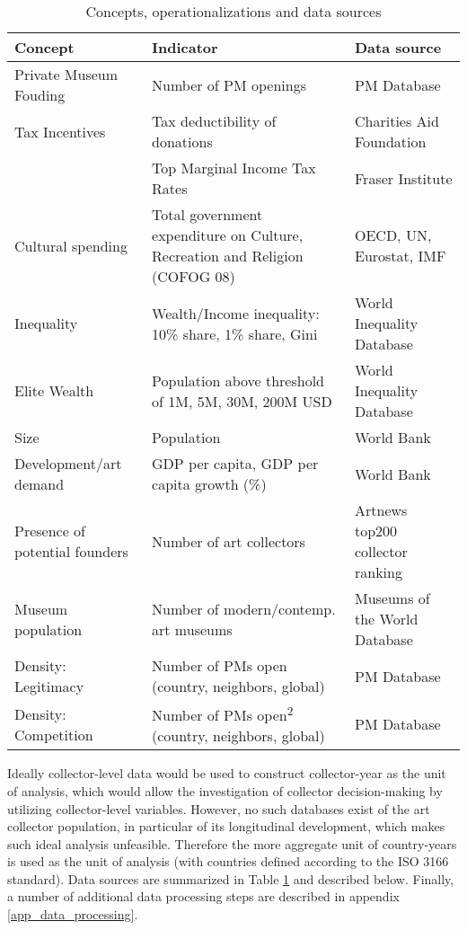\documentclass[11pt]{article}
\begin{document}
\begin{table}[htbp]
\caption{\label{tbl:data_srcs}Concepts, operationalizations and data sources}
\centering
\begin{tabular}{lp{7cm}l}
\hline
Concept & Indicator & Data source\\
\hline
Private Museum Fouding & Number of PM openings & PM Database\\
Tax Incentives & Tax deductibility of donations & Charities Aid Foundation\\
 & Top Marginal Income Tax Rates & Fraser Institute\\
Cultural spending & Total government expenditure on Culture, Recreation and Religion (COFOG 08) & OECD, UN, Eurostat, IMF\\
Inequality & Wealth/Income inequality: 10\% share, 1\% share, Gini & World Inequality Database\\
Elite Wealth & Population above threshold of 1M, 5M, 30M, 200M USD & World Inequality Database\\
Size & Population & World Bank\\
Development/art demand & GDP per capita, GDP per capita growth (\%) & World Bank\\
Presence of potential founders & Number of art collectors & Artnews top200 collector ranking\\
Museum population & Number of modern/contemp. art museums & Museums of the World Database\\
Density: Legitimacy & Number of PMs open (country, neighbors, global) & PM Database\\
Density: Competition & Number of PMs open\textsuperscript{2} (country, neighbors, global) & PM Database\\
\hline
\end{tabular}
\end{table}


Ideally collector-level data would be used to construct collector-year as the unit of analysis, which would allow the investigation of collector decision-making by utilizing collector-level variables. 
However, no such databases exist of the art collector population, in particular of its longitudinal development, which makes such ideal analysis unfeasible. 
Therefore the more aggregate unit of country-years is used as the unit of analysis (with countries defined according to the ISO 3166 standard). 
Data sources are summarized in Table \ref{tbl:data_srcs} and described below.
Finally, a number of additional data processing steps are described in appendix \ref{app_data_processing}.
\end{document}
